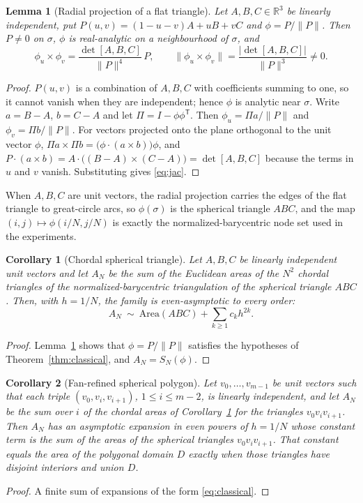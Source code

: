 \documentclass[11pt]{article}
\newtheorem{lemma}{Lemma}
\newtheorem{corollary}{Corollary}
\theoremstyle{remark}
\newcommand{\R}{\mathbb{R}}
\begin{document}
\begin{lemma}[Radial projection of a flat triangle]\label{lem:radial}
Let $A,B,C\in\R^3$ be linearly independent, put $P(u,v)=(1-u-v)A+uB+vC$ and
$\phi=P/\|P\|$. Then $P\neq0$ on $\sigma$, $\phi$ is real-analytic on a neighbourhood of
$\sigma$, and
\begin{equation}\label{eq:jac}
\phi_u\times\phi_v=\frac{\det[A,B,C]}{\|P\|^{4}}\,P,\qquad
\|\phi_u\times\phi_v\|=\frac{|\det[A,B,C]|}{\|P\|^{3}}\neq0 .
\end{equation}
\end{lemma}
\begin{proof}
$P(u,v)$ is a combination of $A,B,C$ with coefficients summing to one, so it cannot vanish
when they are independent; hence $\phi$ is analytic near $\sigma$. Write $a=B-A$, $b=C-A$ and
let $\Pi=I-\phi\phi^{\mathsf T}$. Then $\phi_u=\Pi a/\|P\|$ and $\phi_v=\Pi b/\|P\|$. For
vectors projected onto the plane orthogonal to the unit vector $\phi$,
$\Pi a\times\Pi b=\bigl(\phi\cdot(a\times b)\bigr)\phi$, and
$P\cdot(a\times b)=A\cdot\bigl((B-A)\times(C-A)\bigr)=\det[A,B,C]$ because the terms in $u$ and
$v$ vanish. Substituting gives \eqref{eq:jac}.
\end{proof}

When $A,B,C$ are unit vectors, the radial projection carries the edges of the flat triangle
to great-circle arcs, so $\phi(\sigma)$ is the spherical triangle $ABC$, and the map
$(i,j)\mapsto\phi(i/N,j/N)$ is exactly the normalized-barycentric node set used in the
experiments.

\begin{corollary}[Chordal spherical triangle]\label{cor:triangle}
Let $A,B,C$ be linearly independent unit vectors and let $A_N$ be the sum of the Euclidean
areas of the $N^2$ chordal triangles of the normalized-barycentric triangulation of the
spherical triangle $ABC$. Then, with $h=1/N$, the family is even-asymptotic to every order:
\[
A_N\ \sim\ \mathrm{Area}(ABC)+\sum_{k\ge1}c_{k}h^{2k}.
\]
\end{corollary}
\begin{proof}
Lemma~\ref{lem:radial} shows that $\phi=P/\|P\|$ satisfies the hypotheses of
Theorem~\ref{thm:classical}, and $A_N=S_N(\phi)$.
\end{proof}

\begin{corollary}[Fan-refined spherical polygon]\label{cor:fan}
Let $v_0,\dots,v_{m-1}$ be unit vectors such that each triple $(v_0,v_i,v_{i+1})$,
$1\le i\le m-2$, is linearly independent, and let $A_N$ be the sum over $i$ of the chordal
areas of Corollary~\ref{cor:triangle} for the triangles $v_0v_iv_{i+1}$. Then $A_N$ has an
asymptotic expansion in even powers of $h=1/N$ whose constant term is the sum of the areas of
the spherical triangles $v_0v_iv_{i+1}$. That constant equals the area of the polygonal domain
$D$ exactly when those triangles have disjoint interiors and union $D$.
\end{corollary}
\begin{proof}
A finite sum of expansions of the form \eqref{eq:classical}.
\end{proof}
\end{document}
